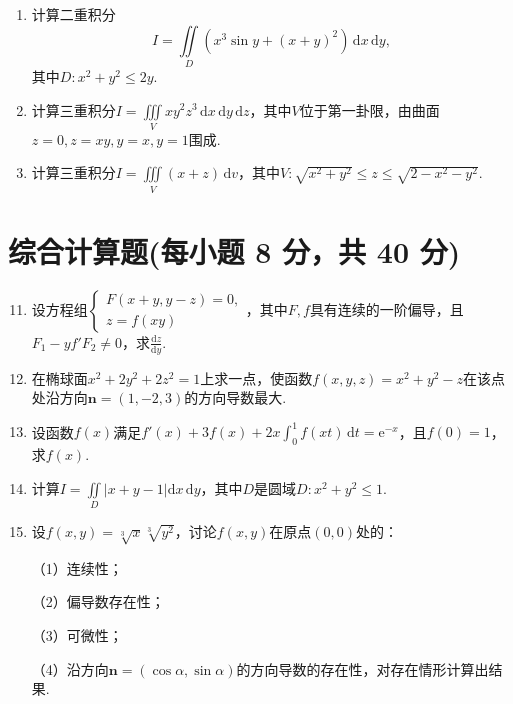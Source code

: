 \documentclass[../Main.tex]{subfiles}
\begin{document}
\begin{enumerate}
    \item 计算二重积分
          \[
              I=\iint\limits_{D}\left(x^3\sin y+(x+y)^{2}\right)\,\mathrm{d}x\,\mathrm{d}y,
          \]
          其中$D:x^{2}+y^{2}\leq2y$.
          \vspace{11em}

    \item 计算三重积分$I=\iiint\limits_{V}xy^{2}z^{3}\,\mathrm{d}x\,\mathrm{d}y\,\mathrm{d}z$，其中$V$位于第一卦限，由曲面$z=0,z=xy,y=x,y=1$围成.
          \vspace{11em}

    \item 计算三重积分$I=\iiint\limits_{V}(x+z)\,\mathrm{d}v$，其中$V:\sqrt{x^{2}+y^{2}}
              \leq z\leq\sqrt{2-x^{2}-y^{2}}$.
          \vspace{11em}
\end{enumerate}

\section{综合计算题(每小题 8 分，共 40 分)}
\begin{enumerate}
    \setcounter{enumi}{10}
    \item 设方程组$\begin{cases}
                  F(x+y,y-z)=0, \\
                  z=f(xy)
              \end{cases}$，其中$F,f$具有连续的一阶偏导，且$F_{1}-yf'F_{2}\neq0$，求$\frac{\mathrm{d}z}{\mathrm{d}y}$.
          \vspace{10em}

    \item 在椭球面$x^{2}+2y^{2}+2z^{2}=1$上求一点，使函数$f(x,y,z)=x^{2}+y^{2}
              -z$在该点处沿方向$\boldsymbol{n}=(1,-2,3)$的方向导数最大.
          \vspace{10em}

    \item 设函数$f(x)$满足$f'(x)+3f(x)+2x\int_{0}^{1}f(xt)\,\mathrm{d}t=\mathrm{e}^{-x}$，且$f(0)=1$，求$f(x)$.
          \vspace{10em}

    \item 计算$I=\iint\limits_{D}|x+y-1|\mathrm{d}x\,\mathrm{d}y$，其中$D$是圆域$D:x^{2}+y^{2}\leq1$.
          \vspace{10em}

    \item 设$f(x,y)=\sqrt[3]{x}\sqrt[3]{y^{2}}$，讨论$f(x,y)$在原点$(0,0)$处的：

          （1）连续性；

          （2）偏导数存在性；

          （3）可微性；

          （4）沿方向$\boldsymbol{n}=(\cos\alpha,\sin\alpha)$的方向导数的存在性，对存在情形计算出结果.
          \vspace{10em}
\end{enumerate}
\end{document}
